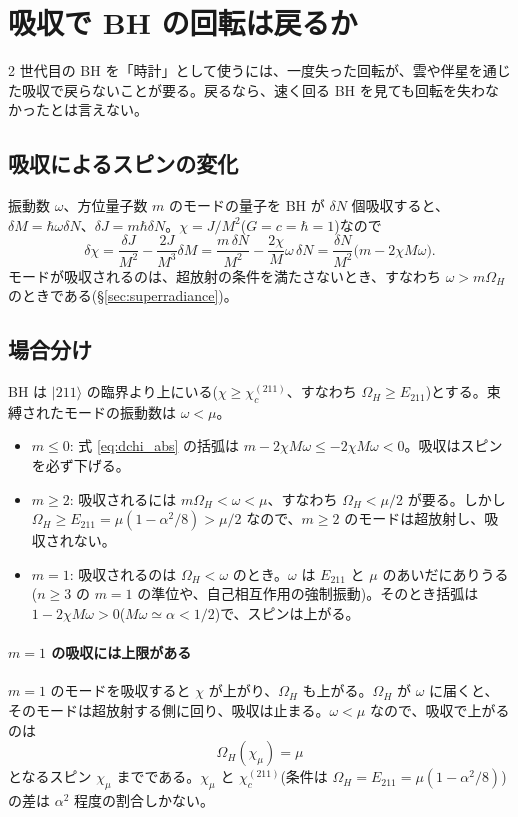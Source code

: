 \section{吸収で BH の回転は戻るか}\label{sec:norestore}

2 世代目の BH を「時計」として使うには、一度失った回転が、雲や伴星を通じた吸収で戻らないことが要る。戻るなら、速く回る BH を見ても回転を失わなかったとは言えない。

\subsection{吸収によるスピンの変化}

振動数 $\omega$、方位量子数 $m$ のモードの量子を BH が $\delta N$ 個吸収すると、$\delta M=\hbar\omega\delta N$、$\delta J=m\hbar\delta N$。$\chi=J/M^2$($G=c=\hbar=1$)なので
\begin{equation}
\delta\chi=\frac{\delta J}{M^2}-\frac{2J}{M^3}\delta M=\frac{m\,\delta N}{M^2}-\frac{2\chi}{M}\omega\,\delta N
=\frac{\delta N}{M^2}\bigl(m-2\chi M\omega\bigr).
\label{eq:dchi_abs}
\end{equation}
モードが吸収されるのは、超放射の条件を満たさないとき、すなわち $\omega>m\Omega_H$ のときである(\S\ref{sec:superradiance})。

\subsection{場合分け}

BH は $|211\rangle$ の臨界より上にいる($\chi\ge\chi_c^{(211)}$、すなわち $\Omega_H\ge E_{211}$)とする。束縛されたモードの振動数は $\omega<\mu$。
\begin{itemize}
\item \textbf{$m\le0$}: 式 \eqref{eq:dchi_abs} の括弧は $m-2\chi M\omega\le-2\chi M\omega<0$。吸収はスピンを必ず下げる。
\item \textbf{$m\ge2$}: 吸収されるには $m\Omega_H<\omega<\mu$、すなわち $\Omega_H<\mu/2$ が要る。しかし $\Omega_H\ge E_{211}=\mu(1-\alpha^2/8)>\mu/2$ なので、$m\ge2$ のモードは超放射し、吸収されない。
\item \textbf{$m=1$}: 吸収されるのは $\Omega_H<\omega$ のとき。$\omega$ は $E_{211}$ と $\mu$ のあいだにありうる($n\ge3$ の $m=1$ の準位や、自己相互作用の強制振動)。そのとき括弧は $1-2\chi M\omega>0$($M\omega\simeq\alpha<1/2$)で、スピンは上がる。
\end{itemize}

\paragraph{$m=1$ の吸収には上限がある}
$m=1$ のモードを吸収すると $\chi$ が上がり、$\Omega_H$ も上がる。$\Omega_H$ が $\omega$ に届くと、そのモードは超放射する側に回り、吸収は止まる。$\omega<\mu$ なので、吸収で上がるのは
\begin{equation}
\Omega_H(\chi_\mu)=\mu
\end{equation}
となるスピン $\chi_\mu$ までである。$\chi_\mu$ と $\chi_c^{(211)}$(条件は $\Omega_H=E_{211}=\mu(1-\alpha^2/8)$)の差は $\alpha^2$ 程度の割合しかない。

